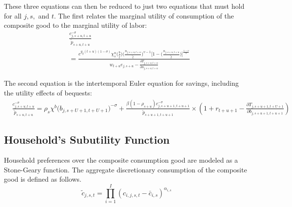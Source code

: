     These three equations can then be reduced to just two equations that must hold for all $j,s,$ and $t$.  The first relates the marginal utility of consumption of the composite good to the marginal utility of labor:
    \begin{equation}\label{EqcEuler}
      \begin{split}
      & \frac{ c_{j,s+u,t+u}^{-\sigma}}{\tilde{p}_{s+u,t+u}} \\
      & = \frac{ e^{g_y (t+u)(1-\sigma)}\chi^n_{s}\biggl(\frac{b}{\tilde{l}}\biggr)\biggl(\frac{n_{j,s+u,t+u}}{\tilde{l}}\biggr)^{v-1}\Biggl[1 - \biggl(\frac{n_{j,s+u,t+u}}{\tilde{l}}\biggr)\Biggr]^{\frac{1-v}{v}} } { w_{t+u} e_{j,s+u} - \frac{\partial T_{j,s+u,t+u}}{\partial n_{j,s+u,t+u}} }
       \end{split}
    \end{equation}

    \noindent\noindent The second equation is the intertemporal Euler equation for savings, including the utility effects of bequests:
    \begin{equation}\label{EqbEuler}
      \begin{split}
      & \frac{ c_{j,s+u,t+u}^{-\sigma}}{\tilde{p}_{s+u,t+u}} = \rho_s\chi^b\bigl(b_{j,s+U+1,t+U+1}\bigr)^{-\sigma}  + \frac{ \beta(1-\rho_{s+u}) c_{j,s+u+1,t+u+1}^{-\sigma}} {\tilde{p}_{s+u+1,t+u+1}} \times \left( 1 + r_{t+u+1} - \frac{\partial T_{j,s+u+1,t+U+1}}{\partial b_{j,s+u+1,t+u+1}} \right)
      \end{split}
    \end{equation}

       
    \subsection{Household's Subutility Function}\label{sec:subutil}
    
    Household preferences over the composite consumption good are modeled as a Stone-Geary function. The aggregate discretionary consumption of the composite good is defined as follows.
    \begin{equation} \label{Eqcagg}
        \tilde{c}_{j,s,t}  = \prod_{i=1}^I \left( c_{i,j,s,t} - \bar c_{i,s} \right) ^{\alpha_{i,s}} 
    \end{equation}

